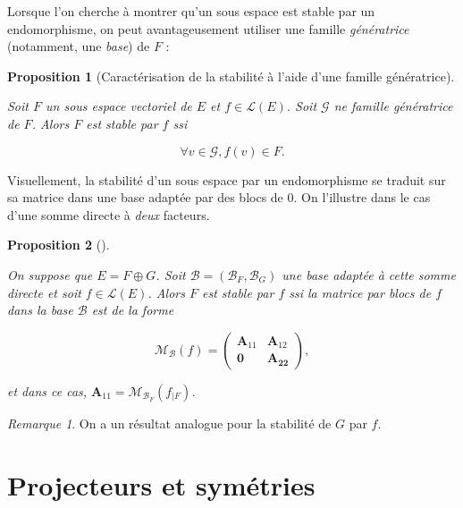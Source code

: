\documentclass[
  french,
  letterpaper,
  DIV=11,
  numbers=noendperiod]{scrreprt}
\theoremstyle{plain}
\theoremstyle{definition}
\theoremstyle{plain}
\newtheorem{proposition}{Proposition}[chapter]
\theoremstyle{plain}
\theoremstyle{definition}
\theoremstyle{definition}
\theoremstyle{plain}
\theoremstyle{remark}
\newtheorem{refremark}{Remarque}[chapter]
\begin{document}
Lorsque l'on cherche à montrer qu'un sous espace est stable par un
endomorphisme, on peut avantageusement utiliser une famille
\emph{génératrice} (notamment, une \emph{base}) de \(F\) :

\begin{proposition}[Caractérisation de la stabilité à l'aide d'une
famille
génératrice]\protect\hypertarget{prp-caractérisation-stabilite}{}\label{prp-caractérisation-stabilite}

Soit \(F\) un sous espace vectoriel de \(E\) et
\(f \in \mathcal{L}(E)\). Soit \(\mathcal{G}\) ne famille génératrice de
\(F\). Alors \(F\) est stable par \(f\) ssi

\[
    \forall v \in \mathcal{G}, f(v) \in F.
\]

\end{proposition}

Visuellement, la stabilité d'un sous espace par un endomorphisme se
traduit sur sa matrice dans une base adaptée par des blocs de \(0\). On
l'illustre dans le cas d'une somme directe à \emph{deux} facteurs.

\begin{proposition}[]\protect\hypertarget{prp-stabilite-bloc}{}\label{prp-stabilite-bloc}

On suppose que \(E=F \oplus G\). Soit
\(\mathcal{B}=(\mathcal{B}_{F},\mathcal{B}_{G})\) une base adaptée à
cette somme directe et soit \(f \in \mathcal{L}(E)\). Alors \(F\) est
stable par \(f\) ssi la matrice par blocs de \(f\) dans la base
\(\mathcal{B}\) est de la forme

\[
    \mathcal{M}_{\mathcal{B}}(f) = \begin{pmatrix}
        \boldsymbol{A}_{11}& \boldsymbol{A}_{12}\\
\boldsymbol{0}& \boldsymbol{A_{22}}
    \end{pmatrix},
\]

et dans ce cas,
\(\boldsymbol{A}_{11} = \mathcal{M}_{\mathcal{B}_{F}}(f_{|F})\).

\end{proposition}

\begin{refremark}
On a un résultat analogue pour la stabilité de \(G\) par \(f\).

\label{rem-stabilite-bloc}

\end{refremark}

\section{Projecteurs et
symétries}\label{sec-03-projecteurs-et-symetries}
\end{document}
